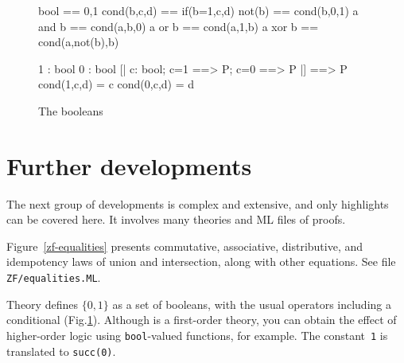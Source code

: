 \begin{figure}
%
\begin{ttbox}
       bool == {\ttlbrace}0,1{\ttrbrace}
       cond(b,c,d) == if(b=1,c,d)
        not(b)  == cond(b,0,1)
        a and b == cond(a,b,0)
         a or b  == cond(a,1,b)
        a xor b == cond(a,not(b),b)

        1 : bool
        0 : bool
          [| c: bool;  c=1 ==> P;  c=0 ==> P |] ==> P
         cond(1,c,d) = c
         cond(0,c,d) = d
\end{ttbox}
\caption{The booleans} \label{zf-bool}
\end{figure}


\section{Further developments}
The next group of developments is complex and extensive, and only
highlights can be covered here.  It involves many theories and ML files of
proofs. 

Figure~\ref{zf-equalities} presents commutative, associative, distributive,
and idempotency laws of union and intersection, along with other equations.
See file \texttt{ZF/equalities.ML}.

Theory  defines $\{0,1\}$ as a set of booleans, with the usual
operators including a conditional (Fig.\ts\ref{zf-bool}).  Although {\ZF} is a
first-order theory, you can obtain the effect of higher-order logic using
\texttt{bool}-valued functions, for example.  The constant~\texttt{1} is
translated to \texttt{succ(0)}.


